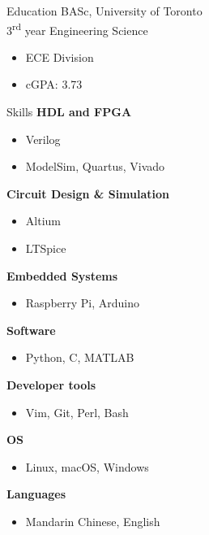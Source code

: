 \documentclass[hidelinks]{my_resume} %
\begin{document}
    \begin{minipage}[t]{0.3\textwidth}
        \begin{rSection}{Education}
        \vspace{5pt}
            BASc, University of Toronto \\
            3\textsuperscript{rd} year Engineering Science
            \medskip
            \begin{itemize}
                \item ECE Division 
                \item cGPA: 3.73
            \end{itemize}
        \end{rSection}

        \vspace{10pt} 
        \begin{rSection}{Skills}
        \vspace{5pt}
            \textbf{HDL and FPGA}
            \begin{itemize}
                \item   Verilog
                \item   ModelSim, Quartus, Vivado
            \end{itemize}
            
            \textbf{Circuit Design \& Simulation}
            \begin{itemize}
                \item   Altium
                \item   LTSpice
            \end{itemize}
            \textbf{Embedded Systems }
            \begin{itemize}
                \item Raspberry Pi, Arduino 
            \end{itemize}
        \vspace{5pt}
            \textbf{Software}
            \begin{itemize}
                \item Python, C, MATLAB
            \end{itemize}
            \textbf{Developer tools}
            \begin{itemize}
                \item Vim, Git, Perl, Bash
            \end{itemize}
            \textbf{OS}
            \begin{itemize}
                \item Linux, macOS, Windows
            \end{itemize}
            \textbf{Languages}
            \begin{itemize}
                \item Mandarin Chinese, English
            \end{itemize}
        \end{rSection}
       

\end{minipage}
\end{document}
